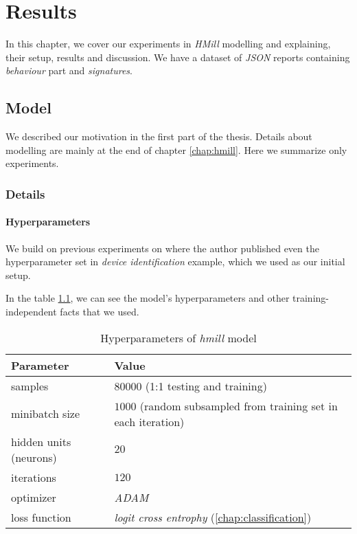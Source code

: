 \chapter{Results} \label{chap:results}
In this chapter, we cover our experiments in \emph{HMill} modelling and explaining, their setup, results and discussion. We have a dataset of \emph{JSON} reports containing \emph{behaviour} part and \emph{signatures}.

\section{Model}
We described our motivation in the first part of the thesis. Details about modelling are mainly at the end of chapter \ref{chap:hmill}. Here we summarize only experiments.

\subsection{Details}
\subsubsection{Hyperparameters}
We build on previous experiments on \cite{Mandlik2020} where the author published even the hyperparameter set in \emph{device identification} example, which we used as our initial setup.

In the table \ref{tab:hyperparams}, we can see the model's hyperparameters and other training-independent facts that we used.

\begin{table}[h]
  \centering
  \caption{Hyperparameters of \emph{hmill} model}
  \begin{tabular}{p{6cm}p{8cm}} 
      \toprule
      \textbf{Parameter} &
      \textbf{Value} \\
      \midrule
      samples & $80000$ (1:1 testing and training) \\
      \midrule
      minibatch size & $1000$ (random subsampled from training set in each iteration)\\
      \midrule
      hidden units (neurons)& $20$\\
      \midrule
      iterations & $120$\\
      \midrule
      optimizer & \emph{ADAM} \cite{Kingma2014}\\
      \midrule
      loss function & \emph{logit cross entrophy} (\ref{chap:classification})\\
      \bottomrule
  \end{tabular}
  \label{tab:hyperparams}
\end{table}

